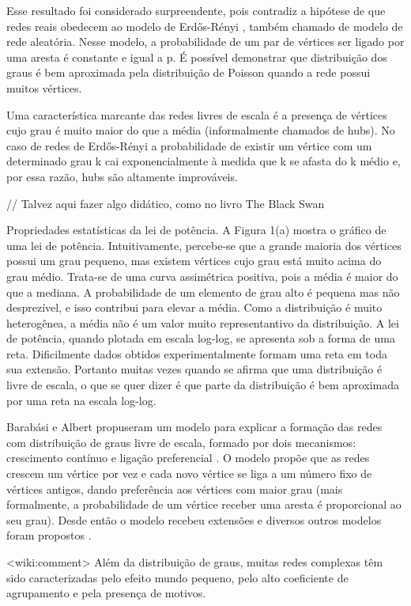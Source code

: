 \documentclass{article}
\begin{document}
Esse resultado foi considerado surpreendente, pois contradiz a hipótese de que redes reais obedecem ao modelo de Erdős-Rényi \cite{Erdos1959}, também chamado de modelo de rede aleatória. Nesse modelo, a probabilidade de um par de vértices ser ligado por uma aresta é constante e igual a p. É possível demonstrar que distribuição dos graus é bem aproximada pela distribuição de Poisson quando a rede possui muitos vértices.

Uma característica marcante das redes livres de escala é a presença de vértices cujo grau é muito maior do que a média (informalmente chamados de hubs). No caso de redes de Erdős-Rényi a probabilidade de existir um vértice com um determinado grau k cai exponencialmente à medida que k se afasta do k médio e, por essa razão, hubs são altamente improváveis.

// Talvez aqui fazer algo didático, como no livro The Black Swan

Propriedades estatísticas da lei de potência. A Figura 1(a) mostra o gráfico de uma lei de potência. Intuitivamente, percebe-se que a grande maioria dos vértices possui um grau pequeno, mas existem vértices cujo grau está muito acima do grau médio. Trata-se de uma curva assimétrica positiva, pois a média é maior do que a mediana. A probabilidade de um elemento de grau alto é pequena mas não desprezível, e isso contribui para elevar a média. Como a distribuição é muito heterogênea, a média não é um valor muito representantivo da distribuição. A lei de potência, quando plotada em escala log-log, se apresenta sob a forma de uma reta. Dificilmente dados obtidos experimentalmente formam uma reta em toda sua extensão. Portanto muitas vezes quando se afirma que uma distribuição é livre de escala, o que se quer dizer é que parte da distribuição é bem aproximada por uma reta na escala log-log.

Barabási e Albert propuseram um modelo para explicar a formação das redes com distribuição de graus livre de escala, formado por dois mecanismos: crescimento contínuo e ligação preferencial \cite{Albert2002}. O modelo propõe que as redes crescem um vértice por vez e cada novo vértice se liga a um número fixo de vértices antigos, dando preferência aos vértices com maior grau (mais formalmente, a probabilidade de um vértice receber uma aresta é proporcional ao seu grau). Desde então o modelo recebeu extensões e diversos outros modelos foram propostos \cite{Albert2000,Kumar2000,Aiello2000b,Dorogovtsev2002,Bollobas2003,Deo2005}.

<wiki:comment>
Além da distribuição de graus, muitas redes complexas têm sido caracterizadas pelo efeito mundo pequeno, pelo alto coeficiente de agrupamento e pela presença de motivos.
\end{document}
